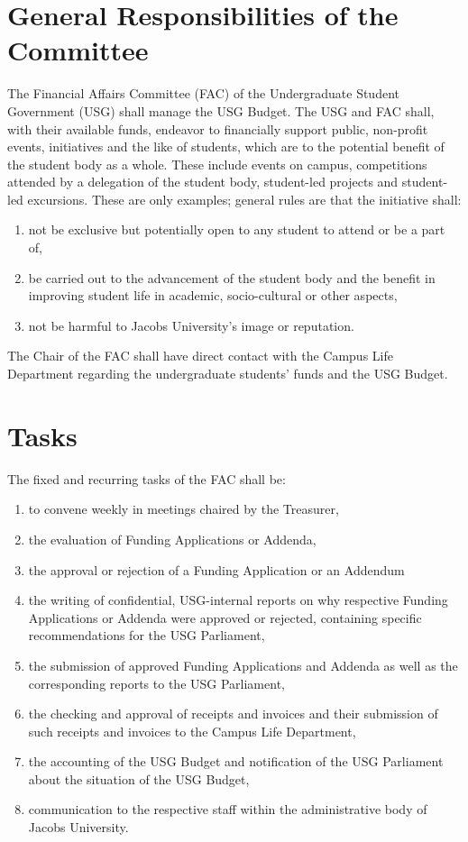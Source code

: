 
\label{FinByLawsdef}
\section{General Responsibilities of the Committee}
The Financial Affairs Committee (FAC) of the Undergraduate Student Government (USG) shall manage the USG Budget. The USG and FAC shall, with their available funds, endeavor to financially support public, non-profit events, initiatives and the like of students, which are to the potential benefit of the student body as a whole. These include events on campus, competitions attended by a delegation of the student body, student-led projects and student-led excursions. These are only examples; general rules are that the initiative shall:
\begin{enumerate}
\item	not be exclusive but potentially open to any student to attend or be a part of, 
\item	be carried out to the advancement of the student body and the benefit in improving student life in academic, socio-cultural or other aspects,
\item	not be harmful to Jacobs University's image or reputation.
\end{enumerate}

The Chair of the FAC shall have direct contact with the Campus Life Department regarding the undergraduate students' funds and the USG Budget.


\section{Tasks}
The fixed and recurring tasks of the FAC shall be: 
\begin{enumerate}
\item to convene weekly in meetings chaired by the Treasurer,
\item the evaluation of Funding Applications or Addenda,
\item the approval or rejection of a Funding Application or an Addendum
\item the writing of confidential, USG-internal reports on why respective Funding Applications or Addenda were approved or rejected, containing specific recommendations for the USG Parliament,
\item the submission of approved Funding Applications and Addenda as well as the corresponding reports to the USG Parliament,
\item the checking and approval of receipts and invoices and their submission of such receipts and invoices to the Campus Life Department,
\item the accounting of the USG Budget and notification of the USG Parliament about the situation of the USG Budget,
\item communication to the respective staff within the administrative body of Jacobs University.
\end{enumerate}


